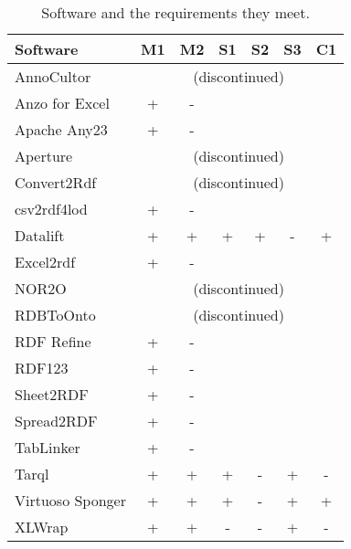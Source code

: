 \begin{center}
\begin{table}[ht]
\centering
\begin{tabular}{|p{}|c|c|c|c|c|c|} 
\hline
\textbf{Software} & \textbf{M1} & \textbf{M2} & \textbf{S1} & \textbf{S2} & \textbf{S3} & \textbf{C1} \\ \hline
AnnoCultor & \multicolumn{6}{c}{\cellcolor{lightgray}(discontinued)}  \\ \hline
Anzo for Excel & + & - & \cellcolor{lightgray} & \cellcolor{lightgray} & \cellcolor{lightgray} & \cellcolor{lightgray}  \\ \hline
Apache Any23 & + & - & \cellcolor{lightgray} & \cellcolor{lightgray} & \cellcolor{lightgray} & \cellcolor{lightgray} \\ \hline
Aperture & \multicolumn{6}{c}{\cellcolor{lightgray}(discontinued)} \\ \hline
Convert2Rdf & \multicolumn{6}{c}{\cellcolor{lightgray}(discontinued)} \\ \hline
csv2rdf4lod & + & - & \cellcolor{lightgray} & \cellcolor{lightgray} & \cellcolor{lightgray} & \cellcolor{lightgray} \\ \hline
Datalift & + & + & + & + & - & + \\ \hline
Excel2rdf & + & - & \cellcolor{lightgray} & \cellcolor{lightgray} & \cellcolor{lightgray} & \cellcolor{lightgray} \\ \hline
NOR2O & \multicolumn{6}{c}{\cellcolor{lightgray}(discontinued)} \\ \hline
RDBToOnto & \multicolumn{6}{c}{\cellcolor{lightgray}(discontinued)} \\ \hline
RDF Refine & + & - & \cellcolor{lightgray} & \cellcolor{lightgray} & \cellcolor{lightgray} & \cellcolor{lightgray}\\ \hline
RDF123 & + & - & \cellcolor{lightgray} & \cellcolor{lightgray} & \cellcolor{lightgray} & \cellcolor{lightgray} \\ \hline
Sheet2RDF & + & - & \cellcolor{lightgray} & \cellcolor{lightgray} & \cellcolor{lightgray} & \cellcolor{lightgray} \\ \hline
Spread2RDF & + & - & \cellcolor{lightgray} & \cellcolor{lightgray} & \cellcolor{lightgray} & \cellcolor{lightgray} \\ \hline
TabLinker & + & - & \cellcolor{lightgray} & \cellcolor{lightgray} & \cellcolor{lightgray} & \cellcolor{lightgray} \\ \hline
Tarql & + & + & + & - & + & - \\ \hline
Virtuoso Sponger & + & + & + & - & + & + \\ \hline
XLWrap & + & + & - & - & + & - \\ \hline
\end{tabular}
\caption{Software and the requirements they meet.\label{table:Stolk2019b:convSoftware}}
\end{table}
\end{center}

